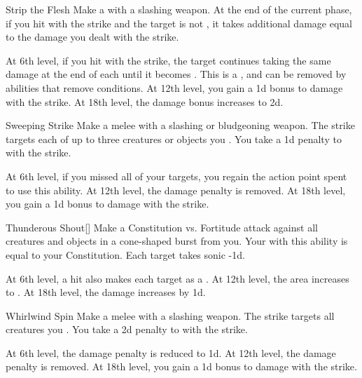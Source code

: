 {            \begin{ability}{Strip the Flesh}
                Make a  with a slashing weapon.
                At the end of the current phase, if you hit with the strike and the target is not , it takes additional damage equal to the damage you dealt with the strike.

                At 6th level, if you hit with the strike, the target continues taking the same damage at the end of each  until it becomes .
                This is a , and can be removed by abilities that remove conditions.
                At 12th level, you gain a \plus1d bonus to damage with the strike.
                At 18th level, the damage bonus increases to \plus2d.
            \end{ability}

            \begin{ability}{Sweeping Strike}
                Make a melee  with a slashing or bludgeoning weapon.
                The strike targets each of up to three creatures or objects you .
                You take a \minus1d penalty to  with the strike.

                At 6th level, if you missed all of your targets, you regain the action point spent to use this ability.
                At 12th level, the damage penalty is removed.
                At 18th level, you gain a \plus1d bonus to damage with the strike.
            \end{ability}

            \begin{ability}{Thunderous Shout}[]
                Make a Constitution vs. Fortitude attack against all creatures and objects in a \areamed cone-shaped burst from you.
                Your  with this ability is equal to your Constitution.
                \hit Each target takes sonic  -1d.

                At 6th level, a hit also makes each target  as a .
                At 12th level, the area increases to \arealarge.
                At 18th level, the damage increases by \plus1d.
            \end{ability}

            \begin{ability}{Whirlwind Spin}
                Make a melee  with a slashing weapon.
                The strike targets all creatures you .
                You take a \minus2d penalty to  with the strike.

                At 6th level, the damage penalty is reduced to \minus1d.
                At 12th level, the damage penalty is removed.
                At 18th level, you gain a \plus1d bonus to damage with the strike.
            \end{ability}
        }

